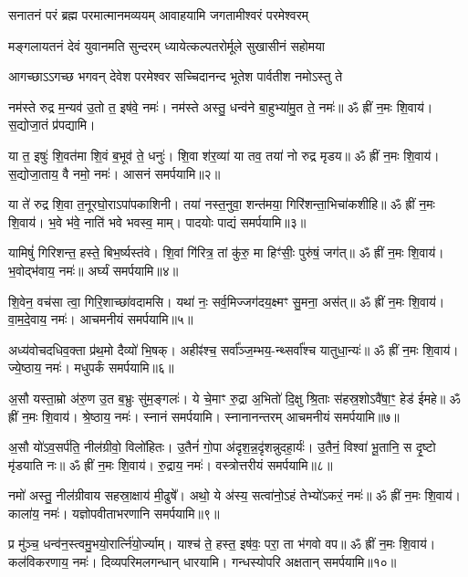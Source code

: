 \twolineshloka
{सनातनं परं ब्रह्म परमात्मानमव्ययम्}
{आवाहयामि जगतामीश्वरं परमेश्वरम्}

\twolineshloka
{मङ्गलायतनं देवं युवानमति सुन्दरम्}
{ध्यायेत्कल्पतरोर्मूले सुखासीनं सहोमया}

\twolineshloka
{आगच्छाऽऽगच्छ भगवन् देवेश परमेश्वर}
{सच्चिदानन्द भूतेश पार्वतीश नमोऽस्तु ते}

{\small\closesection}



नम॑स्ते रुद्र म॒न्यव॑ उ॒तो त॒ इष॑वे॒ नमः॑। नम॑स्ते अस्तु॒ धन्व॑ने बा॒हुभ्या॑मु॒त ते॒ नमः॑॥ ॐ ह्रीं न॒मः शि॒वाय॑। स॒द्योजा॒तं प्र॑पद्यामि।

या त॒ इषुः॑ शि॒वत॑मा शि॒वं ब॒भूव॑ ते॒ धनुः॑। शि॒वा श॑र॒व्या॑ या तव॒ तया॑ नो रुद्र मृडय॥ ॐ ह्रीं न॒मः शि॒वाय॑। स॒द्योजा॒ताय॒ वै नमो॒ नमः॑। आसनं समर्पयामि॥२॥

या ते॑ रुद्र शि॒वा त॒नूरघो॒राऽपा॑पकाशिनी। तया॑ नस्त॒नुवा॒ शन्त॑मया॒ गिरि॑शन्ता॒\-भिचा॑कशीहि॥ ॐ ह्रीं न॒मः शि॒वाय॑। भ॒वे भ॑वे॒ नाति॑ भवे भवस्व॒ माम्। पादयोः पाद्यं समर्पयामि॥३॥

यामिषुं॑ गिरिशन्त॒ हस्ते॒ बिभ॒र्ष्यस्त॑वे। शि॒वां गि॑रित्र॒ तां कु॑रु॒ मा हिꣳ॑सीः॒ पुरु॑षं॒ जग॑त्॥ ॐ ह्रीं न॒मः शि॒वाय॑। भ॒वोद्भ॑वाय॒ नमः॑॥ अर्घ्यं समर्पयामि॥४॥

शि॒वेन॒ वच॑सा त्वा॒ गिरि॒शाच्छा॑वदामसि। यथा॑ नः॒ सर्व॒मिज्जग॑दय॒क्ष्मꣳ सु॒मना॒ अस॑त्॥ ॐ ह्रीं न॒मः शि॒वाय॑। वा॒म॒दे॒वाय॒ नमः॑। आचमनीयं समर्पयामि॥५॥

अध्य॑वोचदधिव॒क्ता प्र॑थ॒मो दैव्यो॑ भि॒षक्। अहीꣴ॑श्च॒ सर्वा᳚ञ्ज॒म्भय॒-न्थ्सर्वा᳚श्च यातुधा॒न्यः॑॥ ॐ ह्रीं न॒मः शि॒वाय॑। ज्ये॒ष्ठाय॒ नमः॑। मधुपर्कं समर्पयामि॥६॥

अ॒सौ यस्ता॒म्रो अ॑रु॒ण उ॒त ब॒भ्रुः सु॑म॒ङ्गलः॑। ये चे॒माꣳ रु॒द्रा अ॒भितो॑ दि॒क्षु श्रि॒ताः स॑हस्र॒शोऽवै॑षा॒ꣳ॒ हेड॑ ईमहे॥ ॐ ह्रीं न॒मः शि॒वाय॑। श्रे॒ष्ठाय॒ नमः॑। स्नानं समर्पयामि। स्नानानन्तरम् आचमनीयं समर्पयामि॥७॥

अ॒सौ यो॑ऽव॒सर्प॑ति॒ नील॑ग्रीवो॒ विलो॑हितः। उ॒तैनं॑ गो॒पा अ॑दृश॒न्न॒दृ॑शन्नुदहा॒र्यः॑। उ॒तैनं॒ विश्वा॑ भू॒तानि॒ स दृ॒ष्टो मृ॑डयाति नः॥ ॐ ह्रीं न॒मः शि॒वाय॑। रु॒द्राय॒ नमः॑। वस्त्रोत्तरीयं समर्पयामि॥८॥

नमो॑ अस्तु॒ नील॑ग्रीवाय सहस्रा॒क्षाय॑ मी॒ढुषे᳚। अथो॒ ये अ॑स्य॒ सत्वा॑नो॒ऽहं तेभ्यो॑ऽकरं॒ नमः॑॥ ॐ ह्रीं न॒मः शि॒वाय॑। काला॑य॒ नमः॑। यज्ञोपवीताभरणानि समर्पयामि॥९॥

प्र मु॑ञ्च॒ धन्व॑न॒स्त्वमु॒भयो॒रार्त्नि॑यो॒र्ज्याम्। याश्च॑ ते॒ हस्त॒ इष॑वः॒ परा॒ ता भ॑गवो वप॥ ॐ ह्रीं न॒मः शि॒वाय॑। कल॑विकरणाय॒ नमः॑। दिव्यपरिमलगन्धान् धारयामि। गन्धस्योपरि अक्षतान् समर्पयामि॥१०॥


